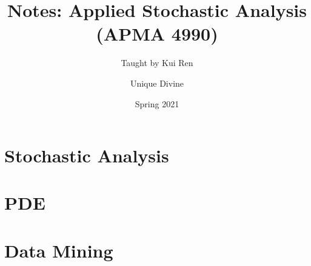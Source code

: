 \documentclass[11pt, fancy, cite=numbers]{elegantbook}
\title{Notes: Applied Stochastic Analysis (APMA 4990)}
\subtitle{Taught by Kui Ren}
\author{Unique Divine}
\institute{Columbia University}
\date{Spring 2021}
\begin{document}
\maketitle

\frontmatter

\tableofcontents

\mainmatter



\part{Stochastic Analysis}


\part{PDE}


\part{Data Mining}





\end{document}
